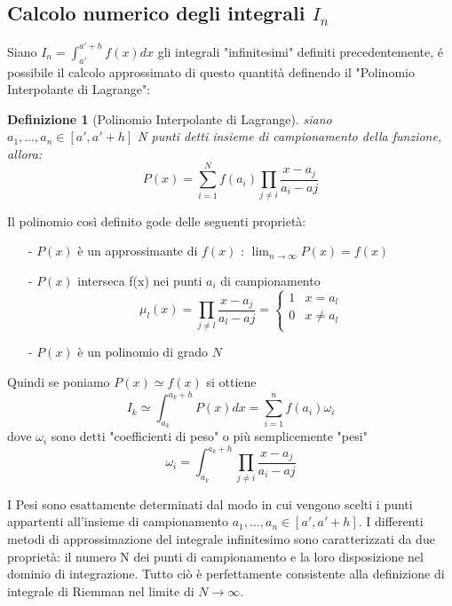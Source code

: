 \documentclass{article}
\newtheorem{legge}{Definizione}
\begin{document}
\subsection{Calcolo numerico degli integrali $I_{n}$}

Siano $I_{n}=\int_{a'}^{a'+h}f(x)dx$ gli integrali "infinitesimi" definiti precedentemente, é possibile il calcolo approssimato di questo quantità definendo il "Polinomio Interpolante di Lagrange":
	
\begin{legge}[Polinomio Interpolante di Lagrange]
	siano $a_{1},\ldots,a_{n} \in [a',a'+ h]$ N punti detti insieme di campionamento della funzione, allora:
    	\begin{equation}
		P(x)=\sum_{i=1}^{N}f(a_{i})\prod_{j \neq i}\dfrac{x-a_{j}}{a_{i}-a{j}}
		\end{equation}
	\end{legge}

Il polinomio così definito gode delle seguenti proprietà:

\begin{itemize}
\item[-] $P(x)$ è un approssimante di $f(x)$ : $\lim_{n\rightarrow\infty}P(x)=f(x)$
\item[-] $P(x)$ interseca f(x) nei punti $a_{i}$ di campionamento
	\begin{displaymath}
		\mu_{l}(x)=\prod_{j \neq l}\dfrac{x-a_{j}}{a_{l}-a{j}} = \left\{
			\begin{array}{ll}
			1 & \textrm{$x=a_{l}$}\\
			0 & \textrm{$x\neq a_{l}$}\\
 			\end{array} 
		\right.
	\end{displaymath}
\item[-] $P(x)$ è un polinomio di grado $N$ 
\end{itemize}

Quindi se poniamo $P(x)\simeq f(x)$ si ottiene
	\begin{equation}
	I_{k}\simeq\int_{a_{k}}^{a_{k}+h}P(x)dx= \sum_{i=1}^{n}f(a_{i})\omega_{i}
	\end{equation}
dove $\omega_{i}$ sono detti "coefficienti di peso" o più semplicemente "pesi"
	\begin{equation}
	\omega_{i}=\int_{a_{k}}^{a_{k}+h}\prod_{j \neq i}\dfrac{x-a_{j}}{a_{i}-a{j}}
	\end{equation}

I Pesi sono esattamente determinati dal modo in cui vengono scelti i punti appartenti all'insieme di campionamento $a_{1},\ldots,a_{n} \in [a',a'+ h]$.
I differenti metodi di approssimazione del integrale infinitesimo sono caratterizzati da due proprietà: il numero N dei punti di campionamento e la loro disposizione nel dominio di integrazione.
Tutto ciò è perfettamente consistente alla definizione di integrale di Riemman nel limite di $N\longrightarrow\infty$.
\end{document}
